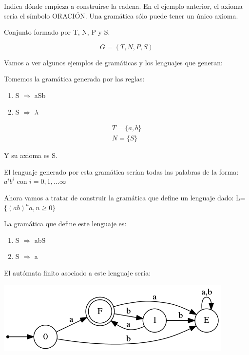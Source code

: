 \documentclass{apuntes}
\begin{document}
\begin{defn}
Indica dónde empieza a construirse la cadena. En el ejemplo anterior, el axioma sería el símbolo ORACIÓN. Una gramática sólo puede tener un único axioma.
\end{defn}

\begin{defn}[Gramática (G)]
Conjunto formado por T, N, P y S.

\[ G = ( T, N, P, S) \]
\end{defn}


Vamos a ver algunos ejemplos de gramáticas y los lenguajes que generan:
\begin{example}
Tomemos la gramática generada por las reglas:
\begin{enumerate}
\item S $\Rightarrow$ aSb
\item S $\Rightarrow$ $\lambda$
\end{enumerate}

\begin{gather*}
T = \lbrace a, b \rbrace \\
N = \lbrace S \rbrace
\end{gather*}

Y su axioma es S.

El lenguaje generado por esta gramática serían todas las palabras de la forma: $a^i b^i$ con $ i=0,1,... \infty$
\end{example}

\begin{example}
Ahora vamos a tratar de construir la gramática que define un lenguaje dado:
L=$\lbrace (ab)^na, n \geq 0 \rbrace$

La gramática que define este lenguaje es:
\begin{enumerate}
\item S $\Rightarrow$ abS
\item S $\Rightarrow$ a
\end{enumerate}

El autómata finito asociado a este lenguaje sería:
\begin{center}
\includegraphics[scale=0.75]{automata1.png}
\end{center}
\end{example}
\end{document}
